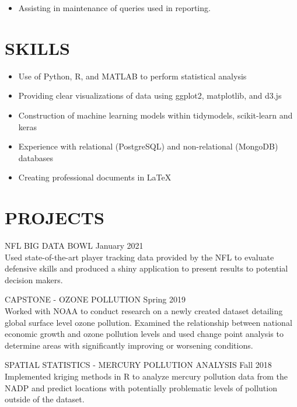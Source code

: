 \documentclass[11pt]{res} %
\begin{document}
\begin{resume}
\begin{itemize} 
	\item Assisting in maintenance of queries used in reporting.
\end{itemize}

\vspace{-0.2in}
\hrulefill
\vspace{-0.2in}  
\section{SKILLS}

\begin{itemize} 
	\item Use of Python, R, and MATLAB to perform statistical analysis
	\item Providing clear visualizations of data using ggplot2, matplotlib, and d3.js
	\item Construction of machine learning models within tidymodels, scikit-learn and keras
	\item Experience with relational (PostgreSQL) and non-relational (MongoDB) databases
	\item Creating professional documents in \LaTeX
\end{itemize}

\vspace{-0.2in}
\hrulefill
\vspace{-0.2in}  

\section{PROJECTS}
\begin{hangparas}{.25in}{1}
NFL BIG DATA BOWL \hfill January 2021 \\
Used state-of-the-art player tracking data provided by the NFL to evaluate defensive skills and produced a shiny application to present results to potential decision makers.
	\vspace{-0.15in}  
	
CAPSTONE - OZONE POLLUTION \hfill Spring 2019	\\
Worked with NOAA to conduct research on a newly created dataset detailing global surface level ozone pollution. Examined the relationship between national economic growth and ozone pollution levels and used change point analysis to determine areas with significantly improving or worsening conditions.
\vspace{-0.15in}  

SPATIAL STATISTICS - MERCURY POLLUTION ANALYSIS \hfill Fall 2018 \\ \indent Implemented kriging methods in R to analyze mercury pollution data from the NADP and predict locations with potentially problematic levels of pollution outside of the dataset.

\end{hangparas}
\end{resume}
\end{document}
